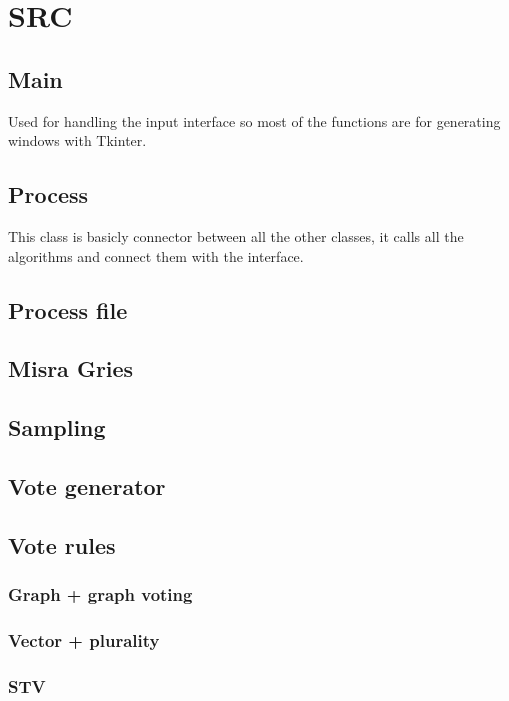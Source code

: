 \documentclass[a4paper,12pt]{report}
\begin{document}
	\chapter{SRC}
	
	\section{Main}
	
	Used for handling the input interface so most of the functions are for generating windows with Tkinter.
	
	\section{Process}
	
	This class is basicly connector between all the other classes, it calls all the algorithms and connect them with the interface.
	
	\section{Process file}
	
	\section{Misra Gries}
	
	\section{Sampling}
	
	\section{Vote generator}
	
	\section{Vote rules}
	
	\subsection{Graph + graph voting}
	
	\subsection{Vector + plurality}
	
	\subsection{STV}
	
\end{document}
